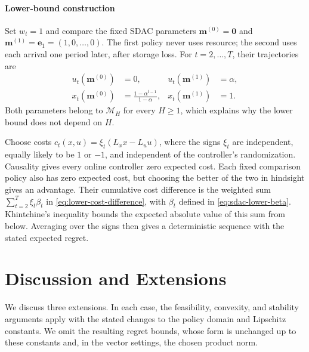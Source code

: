 \documentclass[journal]{IEEEtran}
\theoremstyle{remark}
\begin{document}
\paragraph*{Lower-bound construction}
Set $w_t=1$ and compare the fixed SDAC parameters
$\mathbf{m}^{(0)}=\mathbf{0}$ and
$\mathbf{m}^{(1)}=\mathbf{e}_1=(1,0,\ldots,0)$.
The first policy never uses resource; the second uses each arrival one
period later, after storage loss. For $t=2,\ldots,T$, their trajectories are
\[
\begin{aligned}
u_t(\mathbf{m}^{(0)})&=0,&
u_t(\mathbf{m}^{(1)})&=\alpha,\\
x_t(\mathbf{m}^{(0)})&=\frac{1-\alpha^{t-1}}{1-\alpha},&
x_t(\mathbf{m}^{(1)})&=1.
\end{aligned}
\]
Both parameters belong to $\mathcal{M}_H$ for every $H\ge1$, which
explains why the lower bound does not depend on $H$.

Choose costs $c_t(x,u)=\xi_t(L_xx-L_uu)$, where the signs $\xi_t$ are
independent, equally likely to be $1$ or $-1$, and independent of the
controller's randomization. Causality gives every online controller zero
expected cost. Each fixed comparison policy also has zero expected cost,
but choosing the better of the two in hindsight gives an advantage.
Their cumulative cost difference is the weighted sum
$\sum_{t=2}^T\xi_t\beta_t$ in \eqref{eq:lower-cost-difference}, with
$\beta_t$ defined in \eqref{eq:sdac-lower-beta}.
Khintchine's inequality \cite{szarek1976best} bounds the expected absolute
value of this sum from below. Averaging over the signs then gives a
deterministic sequence with the stated expected regret.

\section{Discussion and Extensions}
\label{sec:extensions}

We discuss three extensions. In each case, the feasibility, convexity, and
stability arguments apply with the stated changes to the policy domain and
Lipschitz constants. We omit the resulting regret bounds, whose form is unchanged
up to these constants and, in the vector settings, the chosen product norm.
\end{document}
